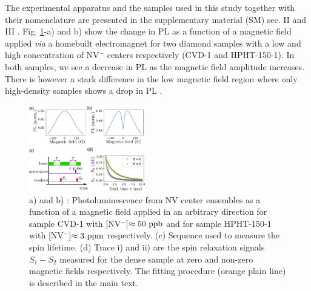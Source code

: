 \documentclass[preprintnumbers,amsmath,amssymb,superscriptaddress,twocolumn,showpacs]{revtex4-2}
\begin{document}
The experimental apparatus and the samples used in this study together with their nomenclature are presented in the supplementary material (SM) sec. II and III \citep{SI_low_filed_CR}\nocite{anishchik2015low, filimonenko2020weak, van1990electric, giri_coupled_2018, giri_selective_2019, Hall,jarmola_temperature-_2012}. 
Fig.  \ref{T1}-a) and b) show the change in PL as a function of a magnetic field applied {\it via} a homebuilt electromagnet for two diamond samples with a low and high concentration of NV$^-$ centers respectively (CVD-1 and HPHT-150-1). In both samples, we see a decrease in PL as the magnetic field amplitude increases. There is however a stark difference in the low magnetic field region where only high-density samples shows a drop in PL \citep{jarmola_longitudinal_2015,  mrozek_longitudinal_2015}. 
\begin{figure}
\includegraphics[width=0.45\textwidth]{fig_T1.pdf}
\caption{a) and b) : Photoluminescence from NV center ensembles as a function of a magnetic field applied in an arbitrary direction for sample CVD-1 with [NV$^-$]$\approx 50\ \rm ppb$ and for sample HPHT-150-1 with [NV$^-$]$\approx 3\ \rm ppm$ respectively. (c) Sequence used to measure the spin lifetime. (d) Trace i) and ii) are the spin relaxation signals $S_1-S_2$ measured for the dense sample at zero and non-zero magnetic fields respectively. The fitting procedure (orange plain line) is described in the main text.}
\label{T1}
\end{figure}
\end{document}
